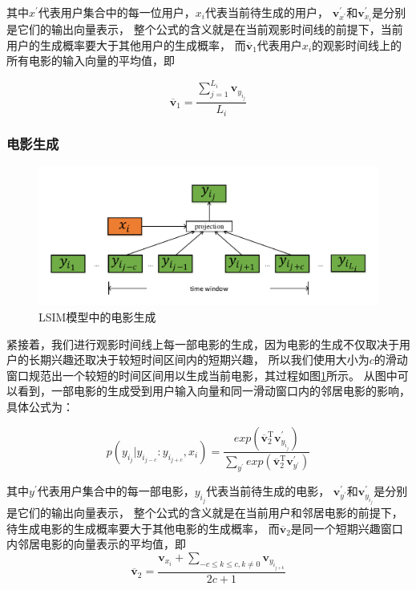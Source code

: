 其中$x^{'}$代表用户集合中的每一位用户，$x_i$代表当前待生成的用户，
$\mathbf{v}_{x^{'}}^{'}$和$\mathbf{v}_{x_i}^{'}$是分别是它们的输出向量表示，
整个公式的含义就是在当前观影时间线的前提下，当前用户的生成概率要大于其他用户的生成概率，
而$\overline{\mathbf{v}}_{1}$代表用户$x_i$的观影时间线上的所有电影的输入向量的平均值，即

\begin{equation}
\overline{\mathbf{v}}_{1} = \frac{\sum_{j=1}^{L_i} \mathbf{v}_{y_{i_j}}}{L_i}
\end{equation}

\subsubsection{电影生成}
\begin{figure}[htbp]
    \centering
    \includegraphics[scale=0.6]{images/doc2vec2.pdf}
    \caption{LSIM模型中的电影生成}
    \label{fig:doc2vec2}
\end{figure}

紧接着，我们进行观影时间线上每一部电影的生成，因为电影的生成不仅取决于用户的长期兴趣还取决于较短时间区间内的短期兴趣，
所以我们使用大小为$c$的滑动窗口规范出一个较短的时间区间用以生成当前电影，其过程如图\ref{fig:doc2vec2}所示。
从图中可以看到，一部电影的生成受到用户输入向量和同一滑动窗口内的邻居电影的影响，具体公式为：

\begin{equation}
p(y_{i_j} | y_{i_{j-c}} : y_{i_{j+c}}, x_i) =
\frac
{
    exp( \overline{\mathbf{v}}_{2}^{\mathrm{T}} \mathbf{v}_{y_{i_j}}^{'} )
}
{
    \sum_{y^{'}} exp( \overline{\mathbf{v}}_{2}^{\mathrm{T}} \mathbf{v}_{y^{'}}^{'} )
}
\end{equation}

其中$y^{'}$代表用户集合中的每一部电影，${y_{i_j}}$代表当前待生成的电影，
$\mathbf{v}_{y^{'}}^{'}$和$\mathbf{v}_{y_{i_j}}^{'}$是分别是它们的输出向量表示，
整个公式的含义就是在当前用户和邻居电影的前提下，待生成电影的生成概率要大于其他电影的生成概率，
而$\overline{\mathbf{v}}_{2}$是同一个短期兴趣窗口内邻居电影的向量表示的平均值，即
\begin{equation}
\overline{\mathbf{v}}_{2} = \frac{
    \mathbf{v}_{x_i} + 
    \sum_{-c \leq k \leq c, k \not= 0}{\mathbf{v}_{y_{i_{j+k}}}}
}{2c+1}
\end{equation}

